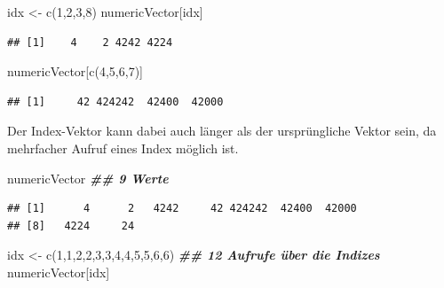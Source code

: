 \documentclass[
]{book}
\newenvironment{Shaded}{\begin{snugshade}}{\end{snugshade}}
\newcommand{\DecValTok}[1]{\textcolor[rgb]{0.00,0.00,0.81}{#1}}
\newcommand{\DocumentationTok}[1]{\textcolor[rgb]{0.56,0.35,0.01}{\textbf{\textit{#1}}}}
\newcommand{\FunctionTok}[1]{\textcolor[rgb]{0.00,0.00,0.00}{#1}}
\newcommand{\NormalTok}[1]{#1}
\newcommand{\OtherTok}[1]{\textcolor[rgb]{0.56,0.35,0.01}{#1}}
\begin{document}
\begin{Shaded}
\begin{Highlighting}[]
\NormalTok{idx }\OtherTok{\textless{}{-}} \FunctionTok{c}\NormalTok{(}\DecValTok{1}\NormalTok{,}\DecValTok{2}\NormalTok{,}\DecValTok{3}\NormalTok{,}\DecValTok{8}\NormalTok{)}
\NormalTok{numericVector[idx]}
\end{Highlighting}
\end{Shaded}

\begin{verbatim}
## [1]    4    2 4242 4224
\end{verbatim}

\begin{Shaded}
\begin{Highlighting}[]
\NormalTok{numericVector[}\FunctionTok{c}\NormalTok{(}\DecValTok{4}\NormalTok{,}\DecValTok{5}\NormalTok{,}\DecValTok{6}\NormalTok{,}\DecValTok{7}\NormalTok{)]}
\end{Highlighting}
\end{Shaded}

\begin{verbatim}
## [1]     42 424242  42400  42000
\end{verbatim}

Der Index-Vektor kann dabei auch länger als der ursprüngliche Vektor sein, da mehrfacher Aufruf eines Index möglich ist.

\begin{Shaded}
\begin{Highlighting}[]
\NormalTok{numericVector }\DocumentationTok{\#\# 9 Werte}
\end{Highlighting}
\end{Shaded}

\begin{verbatim}
## [1]      4      2   4242     42 424242  42400  42000
## [8]   4224     24
\end{verbatim}

\begin{Shaded}
\begin{Highlighting}[]
\NormalTok{idx }\OtherTok{\textless{}{-}} \FunctionTok{c}\NormalTok{(}\DecValTok{1}\NormalTok{,}\DecValTok{1}\NormalTok{,}\DecValTok{2}\NormalTok{,}\DecValTok{2}\NormalTok{,}\DecValTok{3}\NormalTok{,}\DecValTok{3}\NormalTok{,}\DecValTok{4}\NormalTok{,}\DecValTok{4}\NormalTok{,}\DecValTok{5}\NormalTok{,}\DecValTok{5}\NormalTok{,}\DecValTok{6}\NormalTok{,}\DecValTok{6}\NormalTok{)}
\DocumentationTok{\#\# 12 Aufrufe über die Indizes}
\NormalTok{numericVector[idx]}
\end{Highlighting}
\end{Shaded}
\end{document}
